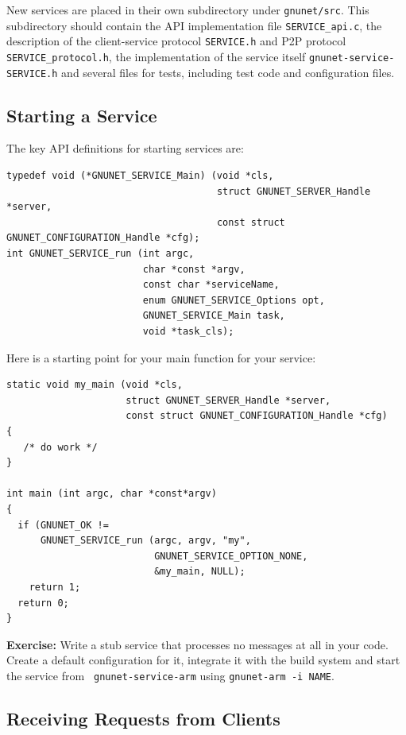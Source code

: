 \documentclass[10pt]{article}
\newcommand{\exercise}[1]{\noindent\begin{boxedminipage}{\textwidth}{\bf Exercise:} #1 \end{boxedminipage}}
\begin{document}
New services are placed in their own subdirectory under {\tt gnunet/src}.
This subdirectory should contain the API implementation file {\tt SERVICE\_api.c},
the description of the client-service protocol {\tt SERVICE.h} and P2P protocol
{\tt SERVICE\_protocol.h}, the implementation of the service itself
{\tt gnunet-service-SERVICE.h} and several files for tests, including test code
and configuration files.

\subsection{Starting a Service}

The key API definitions for starting services are:
\lstset{language=C}
\begin{lstlisting}
typedef void (*GNUNET_SERVICE_Main) (void *cls,
                                     struct GNUNET_SERVER_Handle *server,
                                     const struct GNUNET_CONFIGURATION_Handle *cfg);
int GNUNET_SERVICE_run (int argc,
                        char *const *argv,
                        const char *serviceName,
                       	enum GNUNET_SERVICE_Options opt,
                        GNUNET_SERVICE_Main task,
                        void *task_cls);
\end{lstlisting}

Here is a starting point for your main function for your service:

\lstset{language=c}
\begin{lstlisting}
static void my_main (void *cls,
                     struct GNUNET_SERVER_Handle *server,
                     const struct GNUNET_CONFIGURATION_Handle *cfg)
{
   /* do work */
}

int main (int argc, char *const*argv)
{
  if (GNUNET_OK !=
      GNUNET_SERVICE_run (argc, argv, "my",
                          GNUNET_SERVICE_OPTION_NONE,
                          &my_main, NULL);
    return 1;
  return 0;
}
\end{lstlisting}

\exercise{Write a stub service that processes no messages at all
in your code.  Create a default configuration for it, integrate it
with the build system and start the service from {\tt
  gnunet-service-arm} using {\tt gnunet-arm -i NAME}.}


\subsection{Receiving Requests from Clients}
\end{document}
